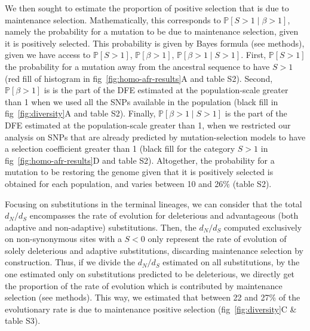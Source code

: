 \documentclass{article}
\newcommand{\dn}{d_N}
\newcommand{\ds}{d_S}
\newcommand{\dnds}{\dn / \ds}
\newcommand{\Sphy}{S}
\newcommand{\given}{\mid}
\newcommand{\Spop}{\beta}
\begin{document}
    We then sought to estimate the proportion of positive selection that is due to maintenance selection.
    Mathematically, this corresponds to $\mathbb{P} [ \Sphy > 1  \given  \Spop > 1]$, namely the probability for a mutation to be due to maintenance selection, given it is positively selected.
    This probability is given by Bayes formula (see methods), given we have access to $\mathbb{P} [ \Sphy > 1 ]$, $\mathbb{P} [ \Spop > 1 ]$, $\mathbb{P} [ \Spop > 1  \given  \Sphy > 1]$.
    First, $\mathbb{P} [ \Sphy > 1 ]$ the probability for a mutation away from the ancestral sequence to have $\Sphy > 1$ (red fill of histogram in fig~\ref{fig:homo-afr-results}A and table S2).
    Second, $\mathbb{P} [ \Spop > 1 ]$ is is the part of the DFE estimated at the population-scale greater than 1 when we used all the SNPs available in the population (black fill in fig~\ref{fig:diversity}A and table S2).
    Finally, $\mathbb{P} [ \Spop > 1  \given  \Sphy > 1]$ is the part of the DFE estimated at the population-scale greater than 1, when we restricted our analysis on SNPs that are already predicted by mutation-selection models to have a selection coefficient greater than 1 (black fill for the category $\Sphy > 1$ in fig~\ref{fig:homo-afr-results}D and table S2).
    Altogether, the probability for a mutation to be restoring the genome given that it is positively selected is obtained for each population, and varies between 10 and 26\% (table S2).

    Focusing on substitutions in the terminal lineages, we can consider that the total $\dnds$ encompasses the rate of evolution for deleterious and advantageous (both adaptive and non-adaptive) substitutions.
    Then, the $\dnds$ computed exclusively on non-synonymous sites with a $\Sphy < 0$ only represent the rate of evolution of solely deleterious and adaptive substitutions, discarding maintenance selection by construction.
    Thus, if we divide the $\dnds$ estimated on all substitutions, by the one estimated only on substitutions predicted to be deleterious, we directly get the proportion of the rate of evolution which is contributed by maintenance selection (see methods).
    This way, we estimated that between 22 and 27\% of the evolutionary rate is due to maintenance positive selection (fig~\ref{fig:diversity}C \& table S3).
\end{document}
